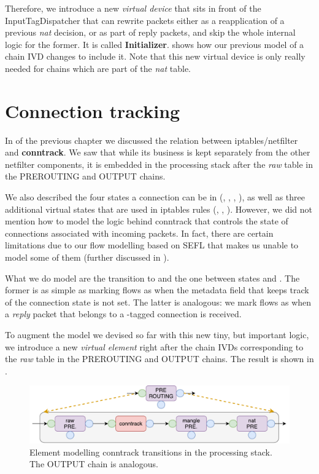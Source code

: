 Therefore, we introduce a new \emph{virtual device} that sits in front of the
InputTagDispatcher that can rewrite packets either as a reapplication of a
previous \emph{nat} decision, or as part of reply packets, and skip the whole
internal logic for the former.  It is called \textbf{Initializer}.
 shows how our previous
model of a chain IVD changes to include it.  Note that this new virtual device
is only really needed for chains which are part of the \emph{nat} table.


\section{Connection tracking}\label{sec:model-conntrack}

In  of the previous chapter we
discussed the relation between iptables/netfilter and \textbf{conntrack}.  We
saw that while its business is kept separately from the other netfilter
components, it is embedded in the processing stack after the \emph{raw} table
in the PREROUTING and OUTPUT chains.

We also described the four states a connection can be in (\NEW, \ESTABLISHED,
\RELATED, \INVALID), as well as three additional virtual states that are used
in iptables rules (\UNTRACKED, \SNAT, \DNAT).  However, we did not mention how
to model the logic behind conntrack that controls the state of connections
associated with incoming packets.  In fact, there are certain limitations due
to our flow modelling based on SEFL that makes us unable to model some of them
(further discussed in ).

What we do model are the transition to \NEW and the one between states \NEW and
\ESTABLISHED.  The former is as simple as marking flows as \NEW when the
metadata field that keeps track of the connection state is not set.  The latter
is analogous: we mark flows as \ESTABLISHED when a \emph{reply} packet that
belongs to a \NEW-tagged connection is received.

To augment the model we devised so far with this new tiny, but important logic,
we introduce a new \emph{virtual element} right after the chain IVDs
corresponding to the \emph{raw} table in the PREROUTING and OUTPUT chains.  The
result is shown in .

\begin{figure}[h]
  \centering
  \captionsetup{justification=centering}
  \includegraphics[scale=0.5]{assets/img/conntrack-chain}
  \caption[Element modelling conntrack transitions in the processing
  stack.]{Element modelling conntrack transitions in the processing stack.  The
  OUTPUT chain is analogous.}
  \label{fig:conntrack-chain}
\end{figure}


